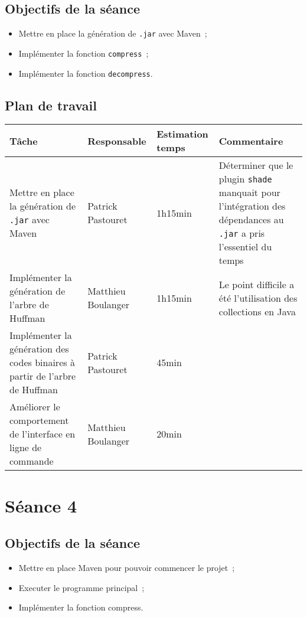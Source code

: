 \documentclass[a4paper,11pt]{article}
\begin{document}
\subsection{Objectifs de la séance}
\begin{itemize}
    \item Mettre en place la génération de \texttt{.jar} avec Maven~;
    \item Implémenter la fonction \texttt{compress}~;
    \item Implémenter la fonction \texttt{decompress}.
\end{itemize}

\subsection{Plan de travail}
\begin{center}
    \begin{tabular}{p{.3\linewidth}p{.3\linewidth}p{.3\linewidth}p{.3\linewidth}}
      \toprule
	Tâche & Responsable & Estimation temps & Commentaire \\
      \midrule
      Mettre en place la génération de \texttt{.jar} avec Maven & 
      Patrick Pastouret & 
      1h15min & 
      Déterminer que le plugin \texttt{shade} manquait pour l’intégration des dépendances au \texttt{.jar} a pris l’essentiel du temps \\
      Implémenter la génération de l’arbre de Huffman &
      Matthieu Boulanger &
      1h15min &
      Le point difficile a été l’utilisation des collections en Java \\
      Implémenter la génération des codes binaires à partir de l’arbre de Huffman &
      Patrick Pastouret &
      45min &
      \\
      Améliorer le comportement de l’interface en ligne de commande & 
      Matthieu Boulanger & 
      20min & 
      \\
      \bottomrule
   \end{tabular}
\end{center}

\section{Séance 4}

\subsection{Objectifs de la séance}
\begin{itemize}
    \item Mettre en place Maven pour pouvoir commencer le projet~;
    \item Executer le programme principal~;
    \item Implémenter la fonction compress.
\end{itemize}
\end{document}
